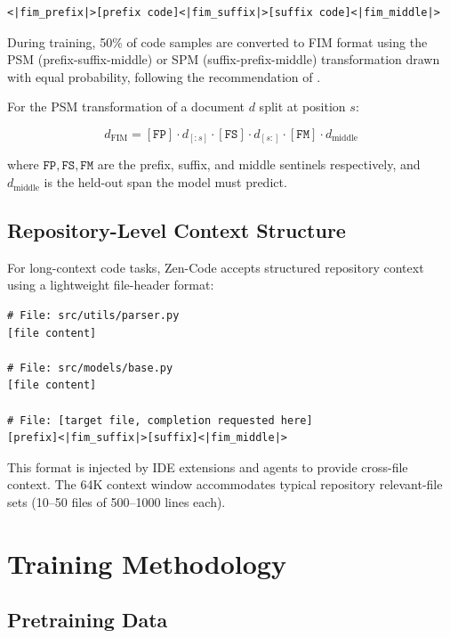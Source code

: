 \documentclass[11pt,a4paper]{article}
\begin{document}
\begin{lstlisting}[language={},caption={FIM token format.}]
<|fim_prefix|>[prefix code]<|fim_suffix|>[suffix code]<|fim_middle|>
\end{lstlisting}

During training, 50\% of code samples are converted to FIM format using the PSM
(prefix-suffix-middle) or SPM (suffix-prefix-middle) transformation drawn with equal
probability, following the recommendation of \cite{bavarian2022fim}.

For the PSM transformation of a document $d$ split at position $s$:

\begin{equation}
  d_{\text{FIM}} = [\texttt{FP}] \cdot d_{[:s]} \cdot [\texttt{FS}] \cdot d_{[s:]} \cdot [\texttt{FM}] \cdot d_{\text{middle}}
\end{equation}

where $\texttt{FP}, \texttt{FS}, \texttt{FM}$ are the prefix, suffix, and middle sentinels
respectively, and $d_{\text{middle}}$ is the held-out span the model must predict.

\subsection{Repository-Level Context Structure}

For long-context code tasks, Zen-Code accepts structured repository context using a
lightweight file-header format:

\begin{lstlisting}[language={},caption={Repository context format.}]
# File: src/utils/parser.py
[file content]

# File: src/models/base.py
[file content]

# File: [target file, completion requested here]
[prefix]<|fim_suffix|>[suffix]<|fim_middle|>
\end{lstlisting}

This format is injected by IDE extensions and agents to provide cross-file context.
The 64K context window accommodates typical repository relevant-file sets (10--50 files
of 500--1000 lines each).

\section{Training Methodology}

\subsection{Pretraining Data}
\end{document}
